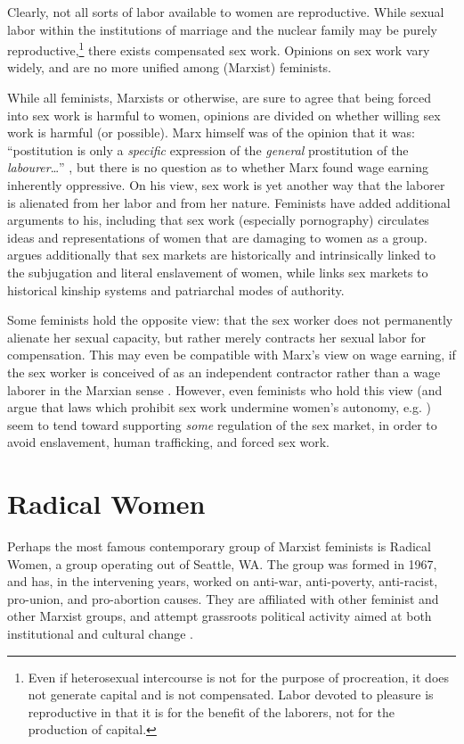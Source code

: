 \documentclass[man,12pt,natbib]{apa6}
\begin{document}
Clearly, not all sorts of labor available to women are reproductive. While
sexual labor within the institutions of marriage and the nuclear family may be
purely reproductive,\footnote{Even if heterosexual intercourse is not for the
	purpose of procreation, it does not generate capital and is not
	compensated. Labor devoted to pleasure is reproductive in that it is for
	the benefit of the laborers, not for the production of capital.} there
exists compensated sex work. Opinions on sex work vary widely, and are no more
unified among (Marxist) feminists.

While all feminists, Marxists or otherwise, are sure to agree that being forced
into sex work is harmful to women, opinions are divided on whether willing sex
work is harmful (or possible). Marx himself was of the opinion that it was:
``postitution is only a \emph{specific} expression of the \emph{general}
prostitution of the \emph{labourer}\ldots'' \citep{Marx44}, but there is no
question as to whether Marx found wage earning inherently oppressive. On his
view, sex work is yet another way that the laborer is alienated from her labor
and from her nature. Feminists have added additional arguments to his,
including that sex work (especially pornography) circulates ideas and
representations of women that are damaging to women as a group.
\citet{Lerner86} argues additionally that sex markets are historically and
intrinsically linked to the subjugation and literal enslavement of women, while
\citet{Rubin75} links sex markets to historical kinship systems and patriarchal
modes of authority.

Some feminists hold the opposite view: that the sex worker does not permanently
alienate her sexual capacity, but rather merely contracts her sexual labor for
compensation. This may even be compatible with Marx's view on wage earning, if
the sex worker is conceived of as an independent contractor rather than a wage
laborer in the Marxian sense \citep{Bromberg97}. However, even feminists who
hold this view (and argue that laws which prohibit sex work undermine women's
autonomy, e.g. \citealp{Almodovar02}) seem to tend toward supporting
\emph{some} regulation of the sex market, in order to avoid enslavement, human
trafficking, and forced sex work.

\section{Radical Women}

Perhaps the most famous contemporary group of Marxist feminists is Radical
Women, a group operating out of Seattle, WA. The group was formed in 1967, and
has, in the intervening years, worked on anti-war, anti-poverty, anti-racist,
pro-union, and pro-abortion causes. They are affiliated with other feminist and
other Marxist groups, and attempt grassroots political activity aimed at both
institutional and cultural change \citep{RadicalWomen}.
\end{document}
